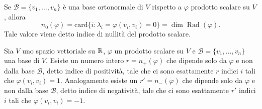 \begin{prop}
	Se $ \mathscr{B} = \{v_1, \ldots, v_n\} $ è una base ortonormale di $ V $ rispetto a $ \varphi $ prodotto scalare su $ V $, allora \[n_0 (\varphi) = \mathrm{card}\{i : \lambda_i = \varphi(v_i, v_i) = 0\} = \dim{\operatorname{Rad}{(\varphi)}}.\] Tale valore viene detto indice di nullità del prodotto scalare. 
\end{prop}

\begin{thm} \label{thm:Sylvester}
	Sia $ V $ uno spazio vettoriale su $ \mathbb{R} $, $ \varphi $ un prodotto scalare su $ V $ e $ \mathscr{B} = \{v_1, \ldots, v_n\} $ una base di $ V $. Esiste un numero intero $ r = n_{+} (\varphi) $ che dipende solo da $ \varphi $ e non dalla base $ \mathscr{B} $, detto indice di positività, tale che ci sono esattamente $ r $ indici $ i $ tali che $ \varphi(v_i, v_i) = 1 $. Analogamente esiste un $ r' = n_{-} (\varphi) $ che dipende solo da $ \varphi $ e non dalla base $ \mathscr{B} $, detto indice di negatività, tale che ci sono esattamente $ r' $ indici $ i $ tali che $ \varphi(v_i, v_i) = - 1 $.
\end{thm}

